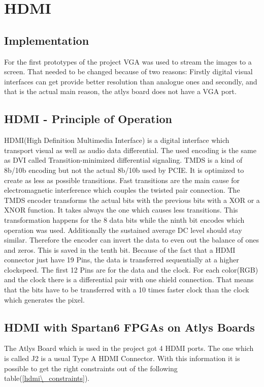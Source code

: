 \newpage
\section{HDMI}
\subsection{Implementation}
For the first prototypes of the project VGA was used to stream the images to a screen. That needed to be changed because of two reasons: Firstly digital visual interfaces can get provide better resolution than analogue ones and secondly, and that is the actual main reason, the atlys board does not have a VGA port.

\subsection{HDMI - Principle of Operation}
HDMI(High Definition Multimedia Interface) is a digital interface which transport visual as well as audio data differential. The used encoding is the same as DVI called Transition-minimized differential signaling. TMDS is a kind of 8b/10b encoding but not the actual 8b/10b used by PCIE. It is optimized to create as less as possible transitions. Fast transitions are the main cause for electromagnetic interference which couples the twisted pair connection. \newline
The TMDS encoder transforms the actual bits with the previous bits with a XOR or a XNOR function. It takes always the one which causes less transitions. This transformation happens for the 8 data bits while the ninth bit encodes which operation was used. Additionally the sustained average DC level should stay similar. Therefore the encoder can invert the data to even out the balance of ones and zeros. This is saved in the tenth bit. \newline
Because of the fact that a HDMI connector just have 19 Pins, the data is transferred sequentially at a higher clockspeed. The first 12 Pins are for the data and the clock. For each color(RGB) and the clock there is a differential pair with one shield connection. That means that the bits have to be transferred with a 10 times faster clock than the clock which generates the pixel.



\subsection{HDMI with Spartan6 FPGAs on Atlys Boards}
The Atlys Board which is used in the project got 4 HDMI ports. The one which is called J2 is a usual Type A HDMI Connector. With this information it is possible to get the right constraints out of the following table(\ref{hdmi\_constraints}).

